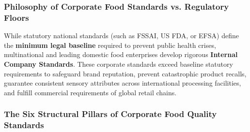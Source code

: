 \documentclass[11pt,a4paper,oneside]{article}
\begin{document}
\subsubsection{Philosophy of Corporate Food Standards vs. Regulatory Floors}
While statutory national standards (such as FSSAI, US FDA, or EFSA) define the \textbf{minimum legal baseline} required to prevent public health crises, multinational and leading domestic food enterprises develop rigorous \textbf{Internal Company Standards}. These corporate standards exceed baseline statutory requirements to safeguard brand reputation, prevent catastrophic product recalls, guarantee consistent sensory attributes across international processing facilities, and fulfill commercial requirements of global retail chains.

\subsubsection{The Six Structural Pillars of Corporate Food Quality Standards}
\end{document}
